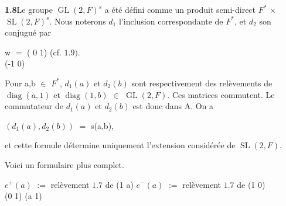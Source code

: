 \documentclass[10pt,a4paper]{article}
\begin{document}
\par\noindent\textbf{1.8}\quad Le groupe $\operatorname{GL}(2,F)^s$ a été défini comme un produit semi-direct $F^*$ $\times{}$ $\operatorname{SL}(2,F)^s$. Nous noterons $d_1$ l'inclusion correspondante de $F^*$, et $d_2$ son conjugué par\par
\par\smallskip\begin{center}\begin{minipage}{0.96\textwidth}\centering
w $=$ ( 0 1) (cf. $1.9)$. \\ (-1 0)
\end{minipage}\end{center}\smallskip
\par Pour a,b $\in{}$ $F^*$, $d_1(a)$ et $d_2(b)$ sont respectivement des relèvements de $\operatorname{diag}(a,1)$ et $\operatorname{diag}(1,b)$ $\in{}$ $\operatorname{GL}(2,F)$. Ces matrices commutent. Le commutateur de $d_1(a)$ et $d_2(b)$ est donc dans A. On a\par
\par\smallskip\begin{center}\begin{minipage}{0.96\textwidth}\centering
$(d_1(a),d_2(b))$ $=$ s(a,b),
\end{minipage}\end{center}\smallskip
\par et cette formule détermine uniquement l'extension considérée de $\operatorname{SL}(2,F)$.\par
\par Voici un formulaire plus complet.\par
\par\medskip{}\par\smallskip
\par\smallskip\begin{center}\begin{minipage}{0.96\textwidth}\centering
$e^+(a)$ $:=$ relèvement $1.7$ de (1 a) $e^-(a)$ $:=$ relèvement $1.7$ de (1 0) \\ (0 1) (a 1)
\end{minipage}\end{center}\smallskip
\end{document}
